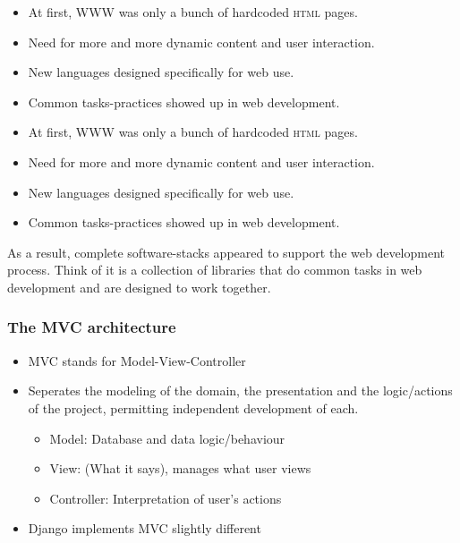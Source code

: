 \documentclass{beamer}
\begin{document}
\begin{frame}
\begin{itemize}[<+->]
  \item At first, WWW was only a bunch of hardcoded \textsc{html} pages.
  \item Need for more and more dynamic content and user interaction.
  \item New languages designed specifically for web use.
  \item Common tasks-practices showed up in web development.
\end{itemize}
\end{frame}

\begin{frame}
\begin{itemize}
  \item At first, WWW was only a bunch of hardcoded \textsc{html} pages.
  \item Need for more and more dynamic content and user interaction.
  \item New languages designed specifically for web use.
  \item Common tasks-practices showed up in web development.
\end{itemize}
As a result, complete software-stacks appeared to support the web development process. Think of it is a collection of libraries that do common tasks in web development and are designed to work together.
\end{frame}

\begin{frame}
  \frametitle{The MVC architecture}
\begin{itemize}[<+->]
  \item MVC stands for Model-View-Controller
  \item Seperates the modeling of the domain, the presentation and the logic/actions of the project, permitting independent development of each.
    \begin{itemize}
      \item Model: Database and data logic/behaviour
      \item View: (What it says), manages what user views
      \item Controller: Interpretation of user's actions
    \end{itemize}
  \item Django implements MVC slightly different
\end{itemize}
\end{frame}
\end{document}
